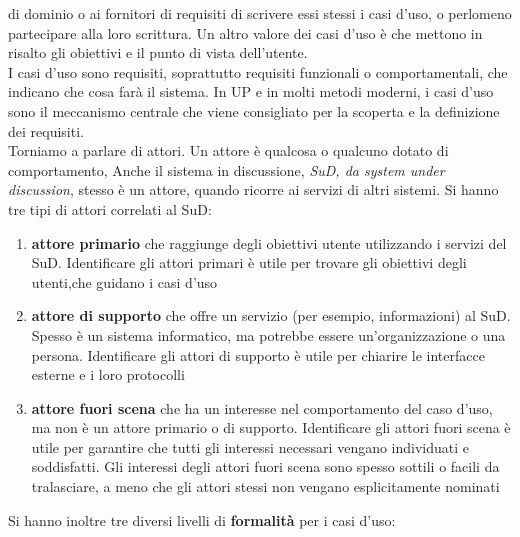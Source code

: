 \documentclass[a4paper,12pt, oneside]{book}
\begin{document}
di dominio o ai fornitori di requisiti di scrivere essi stessi i casi d'uso, o perlomeno partecipare alla loro scrittura. Un altro valore dei casi d'uso è che mettono in risalto gli obiettivi e il punto di vista
dell'utente.\\
I casi d'uso sono requisiti, soprattutto requisiti funzionali o comportamentali, che indicano che cosa farà il sistema. In UP e in molti metodi moderni, i casi d'uso sono il meccanismo
centrale che viene consigliato per la scoperta e la definizione dei requisiti.\\
Torniamo a parlare di attori. Un attore è qualcosa o qualcuno dotato di comportamento, Anche il sistema in discussione,\textit{ SuD, da system under discussion}, stesso è un attore, quando ricorre ai servizi di altri sistemi. Si hanno tre tipi di attori correlati al SuD:
\begin{enumerate}
	\item \textbf{attore primario} che raggiunge degli obiettivi utente utilizzando i servizi del SuD. Identificare gli attori primari è utile per trovare gli obiettivi degli utenti,che guidano i casi d'uso
	\item \textbf{attore di supporto} che offre un servizio (per esempio, informazioni) al SuD. Spesso è un sistema informatico, ma potrebbe essere un'organizzazione o una
	persona. Identificare gli attori di supporto è utile per chiarire le interfacce esterne e i loro protocolli
	\item \textbf{attore fuori scena} che ha un interesse nel comportamento del caso d'uso, ma non è
	un attore primario o di supporto. Identificare gli attori fuori scena è utile per garantire che tutti gli interessi necessari vengano individuati e soddisfatti. Gli interessi degli attori fuori scena sono spesso sottili o facili da tralasciare, a meno che gli attori stessi non vengano esplicitamente nominati
\end{enumerate}
Si hanno inoltre tre diversi livelli di \textbf{formalità} per i casi d'uso:
\end{document}
